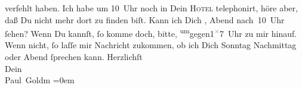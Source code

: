 \begin{ledgroupsized}[t]{13cm}
               verfehlt haben. Ich habe um 10 Uhr noch in Dein \textsc{Hotel} telephonirt, höre aber, daß Du nicht mehr dort zu finden biſt. Kann ich Dich
                  \label{K_L03365-2v}\label{K_L03365-2h}, Abend
                  nach 10 Uhr ſehen? Wenn Du kannſt, ſo komme doch, bitte, \substVorne{}\textsuperscript{um}\substDazwischen{}gegen\substHinten{}{ }1\substVorne{}\textsuperscript{\textcolor{gray}{×}}\substDazwischen{}7\substHinten{} Uhr zu mir hinauf. Wenn {\pb}nicht, ſo laſſe
               mir Nachricht zukommen, ob ich Dich Sonntag{ }Nachmittag oder Abend ſprechen kann.\pend
           \pstart
           Herzlichſt {\\[\baselineskip]}Dein {\\[\baselineskip]}\spacefill\mbox{Paul Goldm}\pend
           \leftskip=0em{}
         
         \endnumbering{}\end{ledgroupsized}  \newcommand{\dateiname}{L03365}\newcommand{\titel}{Paul Goldmann an Arthur Schnitzler, 27. 2. [1903]}\newcommand{\editorInnen}{Martin Anton Müller und Laura Untner}
      